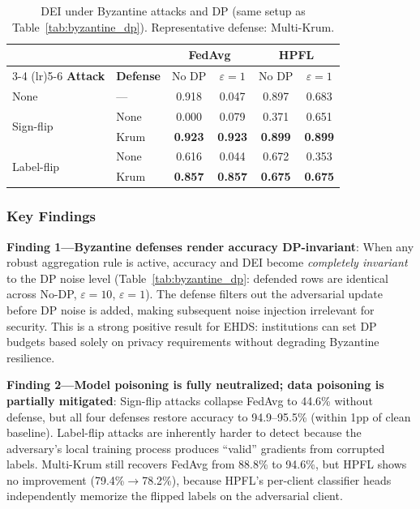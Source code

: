 \documentclass[conference,a4paper]{IEEEtran}
\begin{document}
\begin{table}[htbp]
\centering
\caption{DEI under Byzantine attacks and DP (same setup as Table~\ref{tab:byzantine_dp}). Representative defense: Multi-Krum.}
\label{tab:byzantine_dp_dei}
\small
\begin{tabular}{ll cc cc}
\toprule
& & \multicolumn{2}{c}{\textbf{FedAvg}} & \multicolumn{2}{c}{\textbf{HPFL}} \\
\cmidrule(lr){3-4} \cmidrule(lr){5-6}
\textbf{Attack} & \textbf{Defense} & No DP & $\varepsilon{=}1$ & No DP & $\varepsilon{=}1$ \\
\midrule
None & --- & 0.918 & 0.047 & 0.897 & 0.683 \\
\midrule
\multirow{2}{*}{Sign-flip}
 & None & 0.000 & 0.079 & 0.371 & 0.651 \\
 & Krum & \textbf{0.923} & \textbf{0.923} & \textbf{0.899} & \textbf{0.899} \\
\midrule
\multirow{2}{*}{Label-flip}
 & None & 0.616 & 0.044 & 0.672 & 0.353 \\
 & Krum & \textbf{0.857} & \textbf{0.857} & \textbf{0.675} & \textbf{0.675} \\
\bottomrule
\end{tabular}
\end{table}

\subsubsection{Key Findings}

\textbf{Finding 1---Byzantine defenses render accuracy DP-invariant}: When any robust aggregation rule is active, accuracy and DEI become \textit{completely invariant} to the DP noise level (Table~\ref{tab:byzantine_dp}: defended rows are identical across No-DP, $\varepsilon{=}10$, $\varepsilon{=}1$). The defense filters out the adversarial update before DP noise is added, making subsequent noise injection irrelevant for security. This is a strong positive result for EHDS: institutions can set DP budgets based solely on privacy requirements without degrading Byzantine resilience.

\textbf{Finding 2---Model poisoning is fully neutralized; data poisoning is partially mitigated}: Sign-flip attacks collapse FedAvg to 44.6\% without defense, but all four defenses restore accuracy to 94.9--95.5\% (within 1pp of clean baseline). Label-flip attacks are inherently harder to detect because the adversary's local training process produces ``valid'' gradients from corrupted labels. Multi-Krum still recovers FedAvg from 88.8\% to 94.6\%, but HPFL shows no improvement (79.4\%$\to$78.2\%), because HPFL's per-client classifier heads independently memorize the flipped labels on the adversarial client.
\end{document}
